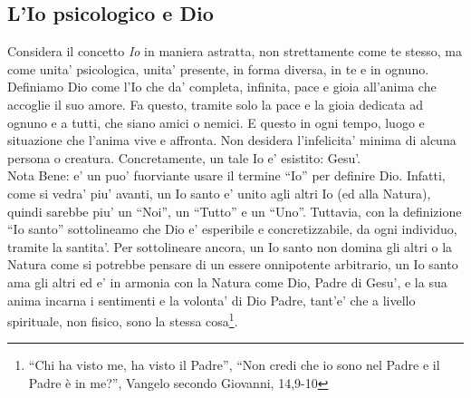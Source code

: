 %
%

\subsection{L'Io psicologico e Dio}

\label{DioScientificamentePoesia}
\label{DioScientificamentePsicologicamente}

Considera il concetto \emph{Io} in maniera astratta, non strettamente come te stesso, ma come unita' psicologica, unita' presente, in forma diversa, in te e in ognuno. Definiamo Dio come l'Io che da' completa, infinita, pace e gioia all'\mbox{anima} che accoglie il suo amore. Fa questo, tramite solo la pace e la gioia dedicata ad ognuno e a tutti, che siano amici o nemici. E questo in ogni tempo, luogo e situazione che l'anima vive e affronta. Non desidera l'infelicita' minima di alcuna persona o creatura. Concretamente, un tale Io e' esistito: Gesu'.\\
Nota Bene: e' un puo' fuorviante usare il termine ``Io'' per definire Dio. Infatti, come si vedra' piu' avanti, un Io santo e' unito agli altri Io (ed alla Natura), quindi sarebbe piu' un ``Noi'', un ``Tutto'' e un ``Uno''. Tuttavia, con la definizione ``Io santo'' sottolineamo che Dio e' esperibile e concretizzabile, da ogni individuo, tramite la santita'. Per sottolineare ancora, un Io santo non domina gli altri o la Natura come si potrebbe pensare di un essere onnipotente arbitrario, un Io santo ama gli altri ed e' in armonia con la Natura come Dio, Padre di Gesu', e la sua anima incarna i sentimenti e la volonta' di Dio Padre, tant'e' che a livello spirituale, non fisico, sono la stessa cosa\footnote{``Chi ha visto me, ha visto il Padre'', ``Non credi che io sono nel Padre e il Padre è in me?'', Vangelo secondo Giovanni, 14,9-10}.

